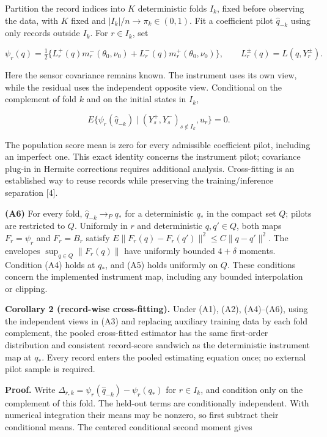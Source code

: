\documentclass[
  american,
  11pt,
]{article}
\begin{document}
Partition the record indices into \(K\) deterministic folds \(I_k\),
fixed before observing the data, with \(K\) fixed and
\(|I_k|/n\to\pi_k\in(0,1)\). Fit a coefficient pilot \(\widehat q_{-k}\)
using only records outside \(I_k\). For \(r\in I_k\), set

\[
\psi_r(q)=\tfrac12\{L_r^+(q)m_r^-(\theta_0,\nu_0)+L_r^-(q)m_r^+(\theta_0,\nu_0)\},
\qquad L_r^\pm(q)=L(q,Y_r^\pm).
\]

Here the sensor covariance remains known. The instrument uses its own
view, while the residual uses the independent opposite view. Conditional
on the complement of fold \(k\) and on the initial states in \(I_k\),

\[
E\{\psi_r(\widehat q_{-k})\mid (Y_s^+,Y_s^-)_{s\notin I_k},u_r\}=0.
\]

The population score mean is zero for every admissible coefficient
pilot, including an imperfect one. This exact identity concerns the
instrument pilot; covariance plug-in in Hermite corrections requires
additional analysis. Cross-fitting is an established way to reuse
records while preserving the training/inference separation {[}4{]}.

\textbf{(A6)} For every fold, \(\widehat q_{-k}\to_P q_*\) for a
deterministic \(q_*\) in the compact set \(Q\); pilots are restricted to
\(Q\). Uniformly in \(r\) and deterministic \(q,q'\in Q\), both maps
\(F_r=\psi_r\) and \(F_r=B_r\) satisfy
\(E\|F_r(q)-F_r(q')\|^2\le C\|q-q'\|^2\). The envelopes
\(\sup_{q\in Q}\|F_r(q)\|\) have uniformly bounded \(4+\delta\) moments.
Condition (A4) holds at \(q_*\), and (A5) holds uniformly on \(Q\).
These conditions concern the implemented instrument map, including any
bounded interpolation or clipping.

\textbf{Corollary 2 (record-wise cross-fitting).} Under (A1), (A2),
(A4)--(A6), using the independent views in (A3) and replacing auxiliary
training data by each fold complement, the pooled cross-fitted estimator
has the same first-order distribution and consistent record-score
sandwich as the deterministic instrument map at \(q_*\). Every record
enters the pooled estimating equation once; no external pilot sample is
required.

\textbf{Proof.} Write
\(\Delta_{r,k}=\psi_r(\widehat q_{-k})-\psi_r(q_*)\) for \(r\in I_k\),
and condition only on the complement of this fold. The held-out terms
are conditionally independent. With numerical integration their means
may be nonzero, so first subtract their conditional means. The centered
conditional second moment gives
\end{document}
